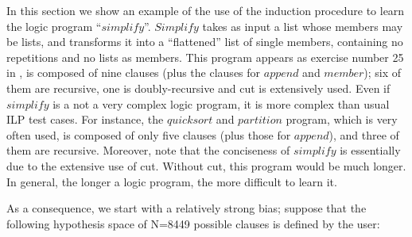 In this section we show an example of the use of the induction procedure
to learn the logic program ``$simplify$''.
$Simplify$ takes as input a list  
whose members may be lists, and transforms it into a ``flattened'' list of
single members, containing no repetitions and no lists as members.
This program  appears as exercise number 25 in \cite{prolbyex88}, is composed
of nine clauses (plus the clauses
for $append$ and $member$);  six of them are recursive, 
one is doubly-recursive
and cut is extensively used. Even if $simplify$ is a not a very complex
logic program, it is more complex than usual ILP test cases.
For instance, the $quicksort$ and $partition$ program, which is very often
used, is composed
of only five clauses (plus those for $append$), 
and three of them are recursive.
Moreover, note that the conciseness of $simplify$ is essentially 
due to the extensive use of cut. Without cut, this program would be
much longer. In general, the longer a logic program,
the more difficult to learn it.
 
As a consequence, we start with a relatively strong bias;
suppose that the following 
hypothesis space of N=8449 possible clauses is defined
by the user:
 

